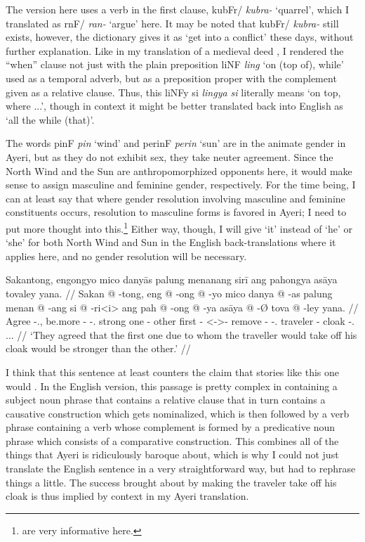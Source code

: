 \documentclass[12pt,paper=a4]{scrartcl}
\newcommand{\ayr}[1]{{\Tagati #1}}
\newcommand{\xayr}[3]{{\Tagati #1} \emph{#2} \enquote*{#3}}
\begin{document}
The \citeyear{becker2004} version here uses a verb in the first clause, \xayr{kubFr/}{kubra-}{quarrel}, which I translated as \xayr{rnF/}{ran-}{argue} here. It may be noted that \ayr{kubFr/} \textit{kubra-} still exists, however, the dictionary gives it as `get into a conflict' these days, without further explanation. Like in my translation of a medieval deed \autocite[9]{becker2015}, I rendered the \enquote{when} clause not just with the plain preposition \xayr{liNF}{ling}{on (top of), while} used as a temporal adverb, but as a preposition proper with the complement given as a relative clause. Thus, this \ayr{liNFy si} \textit{lingya si} literally means `on top, where ...', though in context it might be better translated back into English as `all the while (that)'.

The words \xayr{pinF}{pin}{wind} and \xayr{perinF}{perin}{sun} are in the animate gender in Ayeri, but as they do not exhibit sex, they take neuter agreement. Since the North Wind and the Sun are anthropomorphized opponents here, it would make sense to assign masculine and feminine gender, respectively. For the time being, I can at least say that where gender resolution involving masculine and feminine constituents occurs, resolution to masculine forms is favored in Ayeri; I need to put more thought into this.\footnote{\cite[Ch. 8.3 and 8.4]{corbett2006} are very informative here.} Either way, though, I will give `it' instead of `he' or `she' for both North Wind and Sun in the English back-translations where it applies here, and no gender resolution will be necessary.

\ex %
\begingl
	\glpreamble Sakantong, engongyo mico danyās palung menanang sirī ang pahongya asāya tovaley yana. //
	\gla Sakan @ -tong, eng @ -ong @ -yo mico danya @ -as palung menan @ -ang si @ -ri<i> ang pah @ -ong @ -ya asāya @ -Ø tova @ -ley yana. //
	\glb Agree -\Tpl{}.\N{}, be.more -\Irr{} -\Tsg{}.\N{} strong one -\Parg{} other first -\Aarg{} \Rel{} <-\Aarg{}>-\Ins{} \AgtT{} remove -\Irr{} -\Tsg{}.\M{} traveler -\Top{} cloak -\Parg{}.\Inan{} \Tsg{}.\M{}.\Gen{}. //
	\glft `They agreed that the first one due to whom the traveller would take off his cloak would be stronger than the other.' //
\endgl
\xe

I think that this sentence at least counters the claim that stories like this one would . In the English version, this passage is pretty complex in containing a subject noun phrase that contains a relative clause that in turn contains a causative construction which gets nominalized, which is then followed by a verb phrase containing a verb whose complement is formed by a predicative noun phrase which consists of a comparative construction. This combines all of the things that Ayeri is ridiculously baroque about, which is why I could not just translate the English sentence in a very straightforward way, but had to rephrase things a little. The success brought about by making the traveler take off his cloak is thus implied by context in my Ayeri translation.
\end{document}
